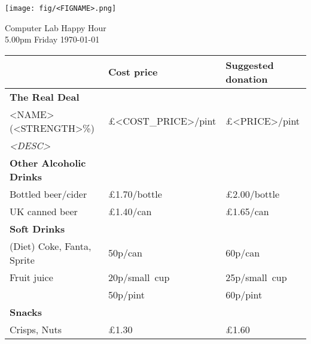 \documentclass[a4paper,12pt]{article}
\begin{document}
\thispagestyle{empty}

\begin{center}
	\texttt{[image: fig/<FIGNAME>.png]} \par \bigskip \bigskip \bigskip
    {\Large Computer Lab Happy Hour} \\ \smallskip
    {5.00pm Friday \today}
\end{center}

\bigskip

\large
\begin{center}

\def\arraystretch{1.1}

\begin{tabular}{p{7.5cm}|p{3cm}|p{3cm}} & \textbf{Cost price} & \textbf{Suggested donation} \\
\hline
\textbf{The Real Deal} & & \\
<NAME> (<STRENGTH>\%) & \pounds <COST_PRICE>/pint & \pounds <PRICE>/pint \\
\small \it <DESC> \medskip & & \\

\hline
{\bf Other Alcoholic Drinks} & & \\
Bottled beer/cider & \pounds 1.70/bottle & \pounds 2.00/bottle \\
UK canned beer & \pounds 1.40/can & \pounds 1.65/can \medskip \\

\hline
{\bf Soft Drinks} &&\\
(Diet) Coke, Fanta, Sprite & 50p/can  & 60p/can \medskip\\
Fruit juice & 20p/small~cup & 25p/small~cup \\
& 50p/pint & 60p/pint \medskip \\

\hline
{\bf Snacks} & & \\
Crisps, Nuts &\pounds 1.30 &\pounds 1.60 \\

\end{tabular}
\end{center}
\end{document}
